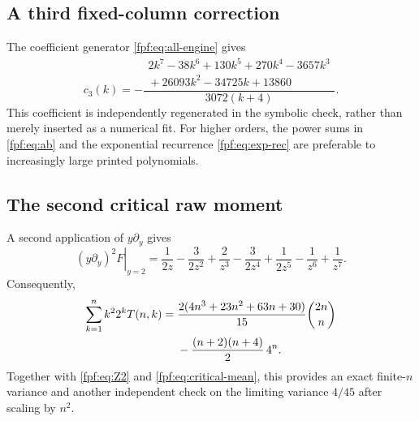 \documentclass[11pt]{article}
\numberwithin{equation}{section}
\theoremstyle{definition}
\begin{document}
\subsection{A third fixed-column correction}
The coefficient generator \eqref{fpf:eq:all-engine} gives
\begin{equation}\label{fpf:eq:c3}
 c_3(k)=-\frac{
 \begin{gathered}
 2k^7-38k^6+130k^5+270k^4-3657k^3\\[-2pt]
 {}+26093k^2-34725k+13860
 \end{gathered}}
 {3072(k+4)}.
\end{equation}
This coefficient is independently regenerated in the symbolic check, rather
than merely inserted as a numerical fit. For higher orders, the power sums
in \eqref{fpf:eq:ab} and the exponential recurrence
\eqref{fpf:eq:exp-rec} are preferable to increasingly large printed polynomials.

\subsection{The second critical raw moment}
A second application of $y\partial_y$ gives
\begin{equation}\label{fpf:eq:second-gf}
 \left.(y\partial_y)^2F\right|_{y=2}
 =\frac1{2z}-\frac3{2z^2}+\frac2{z^3}-\frac3{2z^4}
            +\frac1{2z^5}-\frac1{z^6}+\frac1{z^7}.
\end{equation}
Consequently,
\begin{align}\label{fpf:eq:critical-second}
 \sum_{k=1}^n k^2 2^kT(n,k)
 ={}&\frac{2(4n^3+23n^2+63n+30)}{15}\binom{2n}{n}\notag\\
 &-\frac{(n+2)(n+4)}2\,4^n.
\end{align}
Together with \eqref{fpf:eq:Z2} and \eqref{fpf:eq:critical-mean}, this provides an
exact finite-$n$ variance and another independent check on the limiting
variance $4/45$ after scaling by $n^2$.
\end{document}
